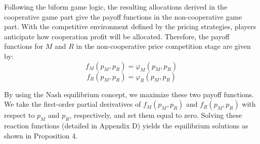 \documentclass[authoryear,preprint,review,times,10pt]{elsarticle}
\begin{document}
Following the biform game logic, the resulting allocations derived in the cooperative game part give the payoff functions in the non-cooperative game part. With the competitive environment defined by the pricing strategies, players anticipate how cooperation profit will be allocated. Therefore, the payoff functions for $M$ and $R$ in the non-cooperative price competition stage are given by:
\begin{equation}
f_M(p_M, p_R) = \varphi_M(p_M, p_R)
\end{equation}
\begin{equation}
f_R(p_M, p_R) = \varphi_R(p_M, p_R)
\end{equation}

By using the Nash equilibrium concept, we maximize these two payoff functions. We take the first-order partial derivatives of $f_M(p_M, p_R)$ and $f_R(p_M, p_R)$ with respect to $p_M$ and $p_R$, respectively, and set them equal to zero. Solving these reaction functions (detailed in Appendix D) yields the equilibrium solutions as shown in Proposition 4.
\end{document}
